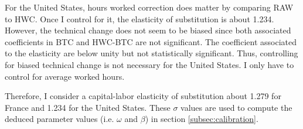For the United States, hours worked correction does matter by comparing RAW to HWC. Once I control for it, the elasticity of substitution is about 1.234. However, the technical change does not seem to be biased since both associated coefficients in BTC and HWC-BTC are not significant. The coefficient associated to the elasticity are below unity but not statistically significant. Thus, controlling for biased technical change is not necessary for the United States. I only have to control for average worked hours.

Therefore, I consider a capital-labor elasticity of substitution about 1.279 for France and 1.234 for the United States. These $\sigma$ values are used to compute the deduced parameter values (i.e. $\omega$ and $\beta$) in section \ref{subsec:calibration}.








